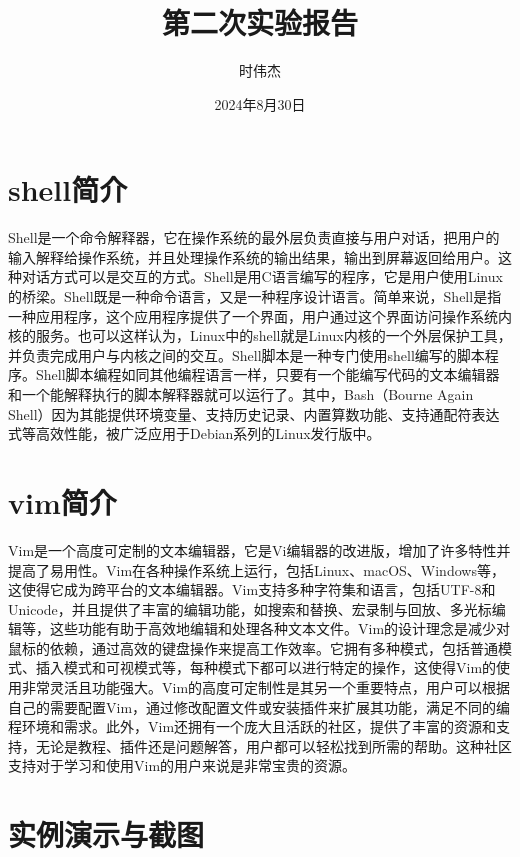 \documentclass[a4paper, 12pt]{article}
\begin{document}
	\title{第二次实验报告}   %
	\author{时伟杰}     %
	\date{2024年8月30日}      %
	\maketitle    %
	\tableofcontents         %
	\newpage          %
	\section{shell简介}         %
	‌‌Shell‌是一个‌命令解释器，它在操作系统的最外层负责直接与用户对话，把用户的输入解释给操作系统，并且处理操作系统的输出结果，输出到屏幕返回给用户。这种对话方式可以是交互的方式。Shell是用‌C语言编写的程序，它是用户使用‌Linux的桥梁。Shell既是一种命令语言，又是一种程序设计语言。简单来说，Shell是指一种应用程序，这个应用程序提供了一个界面，用户通过这个界面访问操作系统内核的服务。也可以这样认为，Linux中的shell就是Linux内核的一个外层保护工具，并负责完成用户与内核之间的交互。Shell脚本是一种专门使用shell编写的脚本程序。Shell脚本编程如同其他编程语言一样，只要有一个能编写代码的文本编辑器和一个能解释执行的脚本解释器就可以运行了。其中，Bash（Bourne Again Shell）因为其能提供环境变量、支持历史记录、内置算数功能、支持通配符表达式等高效性能，被广泛应用于Debian系列的Linux发行版中。‌
	\section{vim简介}
	‌Vim‌是一个高度可定制的文本编辑器，它是Vi编辑器的改进版，增加了许多特性并提高了易用性。Vim在各种操作系统上运行，包括Linux、macOS、Windows等，这使得它成为跨平台的文本编辑器。Vim支持多种字符集和语言，包括UTF-8和Unicode，并且提供了丰富的编辑功能，如搜索和替换、宏录制与回放、多光标编辑等，这些功能有助于高效地编辑和处理各种文本文件。Vim的设计理念是减少对鼠标的依赖，通过高效的键盘操作来提高工作效率。它拥有多种模式，包括普通模式、插入模式和可视模式等，每种模式下都可以进行特定的操作，这使得Vim的使用非常灵活且功能强大。Vim的高度可定制性是其另一个重要特点，用户可以根据自己的需要配置Vim，通过修改配置文件或安装插件来扩展其功能，满足不同的编程环境和需求。此外，Vim还拥有一个庞大且活跃的社区，提供了丰富的资源和支持，无论是教程、插件还是问题解答，用户都可以轻松找到所需的帮助。这种社区支持对于学习和使用Vim的用户来说是非常宝贵的资源。
     
	\section{实例演示与截图}      %
	
\end{document}
